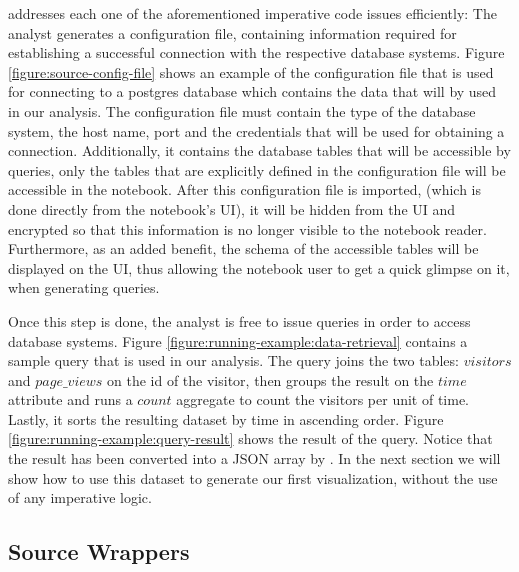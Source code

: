 {\projname} addresses each one of the aforementioned imperative code issues efficiently: The analyst generates a configuration file, containing information required for establishing a successful connection with the respective database systems. Figure \ref{figure:source-config-file} shows an example of the configuration file that is used for connecting to a postgres database which contains the data that will by used in our analysis. The configuration file must contain the type of the database system, the host name, port and the credentials that will be used for obtaining a connection. Additionally, it contains the database tables that will be accessible by queries, only the tables that are explicitly defined in the configuration file will be accessible in the notebook. After this configuration file is imported, (which is done directly from the notebook's UI), it will be hidden from the UI and encrypted so that this information is no longer visible to the notebook reader.  Furthermore, as an added benefit, the schema of the accessible tables will be displayed on the UI, thus allowing the notebook user to get a quick glimpse on it, when generating queries. 

Once this step is done, the analyst is free to issue queries in order to access database systems. Figure \ref{figure:running-example:data-retrieval} contains a sample query that is used in our analysis. The query joins the two tables: $visitors$ and $page\_views$ on the id of the visitor, then groups the result on the $time$ attribute and runs a $count$ aggregate to count the visitors per unit of time. Lastly, it sorts the resulting dataset by time in ascending order. Figure \ref{figure:running-example:query-result} shows the result of the query. Notice that the result has been converted into a JSON array by \projname. In the next section we will show how to use this dataset to generate our first visualization, without the use of any imperative logic.

\subsection{Source Wrappers}
\label{subsection:source-wrappers}


